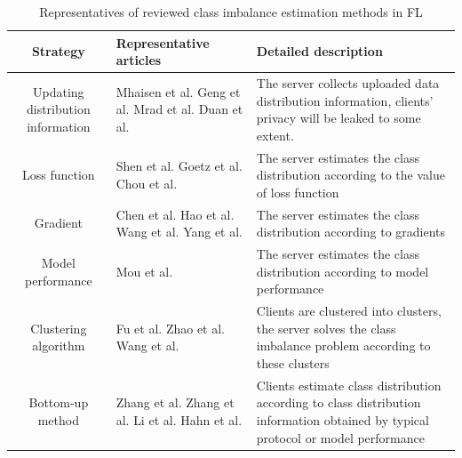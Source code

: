 \documentclass[10pt,journal,compsoc]{IEEEtran}
\begin{document}
\begin{table}[!t]
	\centering
	\caption{Representatives of reviewed class imbalance estimation methods in FL}	  
	\label{class imbalance estimation methods}     		       	
	\begin{tabular}{cp{6.5cm}p{6.5cm}}
		\hline
		Strategy & Representative articles& Detailed description \\ 
		\hline
		Updating distribution information& Mhaisen et al. \cite{mhaisen2021optimal}
		Geng et al. \cite{geng2022bearing}
		Mrad et al. \cite{mrad2021federated}
		Duan et al. \cite{duan2019astraea} \cite{duan2020self}& The server collects uploaded data distribution information, clients' privacy will be leaked to some extent.  \\ \hline
		Loss function& Shen et al. \cite{shen2021agnostic} Goetz et al. \cite{goetz2019active} Chou et al. \cite{chou2022grp}&The server estimates the class distribution according to the value of loss function\\  \hline
		Gradient& Chen et al. \cite{chen2021novel} Hao et al. \cite{hao2021towards} Wang et al. \cite{wang2021addressing} Yang et al. \cite{yang2021federated}&The server estimates the class distribution according to gradients\\ \hline
		Model performance& Mou et al. \cite{mou2021optimized}&The server estimates the class distribution according to model performance \\ \hline
		Clustering algorithm& Fu et al.\cite{fu2021cic} Zhao et al. \cite{zhao2020cluster} Wang et al. \cite{wang2021adaptive} & Clients are clustered into clusters, the server solves the class imbalance problem according to these clusters\\  	\hline	
		Bottom-up method&  Zhang et al. \cite{zhang2021fedsens} Zhang et al. \cite{zhang2021dubhe} Li et al. \cite{li2021sample}  Hahn et al. \cite{hahn2019privacy}&Clients estimate class distribution according to class distribution information obtained by typical protocol or model performance\\  		
		\hline
	\end{tabular}
	
\end{table}
\vspace{-0.2cm}
\end{document}
